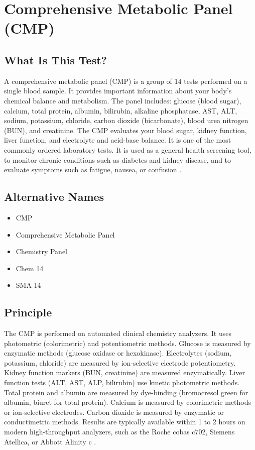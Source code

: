 \chapter{Comprehensive Metabolic Panel (CMP)}

\section*{What Is This Test?}
A comprehensive metabolic panel (CMP) is a group of 14 tests performed on a single blood sample. It provides important information about your body's chemical balance and metabolism. The panel includes: glucose (blood sugar), calcium, total protein, albumin, bilirubin, alkaline phosphatase, AST, ALT, sodium, potassium, chloride, carbon dioxide (bicarbonate), blood urea nitrogen (BUN), and creatinine. The CMP evaluates your blood sugar, kidney function, liver function, and electrolyte and acid-base balance. It is one of the most commonly ordered laboratory tests. It is used as a general health screening tool, to monitor chronic conditions such as diabetes and kidney disease, and to evaluate symptoms such as fatigue, nausea, or confusion \cite{wallach2022interpretation}.

\section*{Alternative Names}
\begin{itemize}
  \item CMP
  \item Comprehensive Metabolic Panel
  \item Chemistry Panel
  \item Chem 14
  \item SMA-14
\end{itemize}
\section*{Principle}
The CMP is performed on automated clinical chemistry analyzers. It uses photometric (colorimetric) and potentiometric methods. Glucose is measured by enzymatic methods (glucose oxidase or hexokinase). Electrolytes (sodium, potassium, chloride) are measured by ion-selective electrode potentiometry. Kidney function markers (BUN, creatinine) are measured enzymatically. Liver function tests (ALT, AST, ALP, bilirubin) use kinetic photometric methods. Total protein and albumin are measured by dye-binding (bromocresol green for albumin, biuret for total protein). Calcium is measured by colorimetric methods or ion-selective electrodes. Carbon dioxide is measured by enzymatic or conductimetric methods. Results are typically available within 1 to 2 hours on modern high-throughput analyzers, such as the Roche cobas c702, Siemens Atellica, or Abbott Alinity c \cite{tietz2023textbook}.

